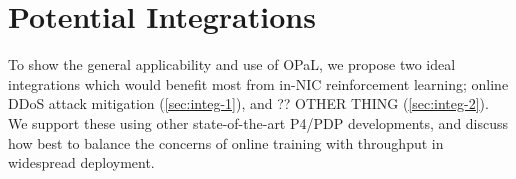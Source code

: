\documentclass[sigconf,natbib=false]{acmart}
\newcommand{\approachshort}{OPaL}
\begin{document}
%		
%		
%		
%		
%		
%		
%		
%		
%		

\section{Potential Integrations}\label{sec:potential-integrations}
To show the general applicability and use of \approachshort{}, we propose two ideal integrations which would benefit most from in-NIC reinforcement learning; online DDoS attack mitigation (\cref{sec:integ-1}), and ?? OTHER THING (\cref{sec:integ-2}).
We support these using other state-of-the-art P4/PDP developments, and discuss how best to balance the concerns of online training with throughput in widespread deployment.
\end{document}
